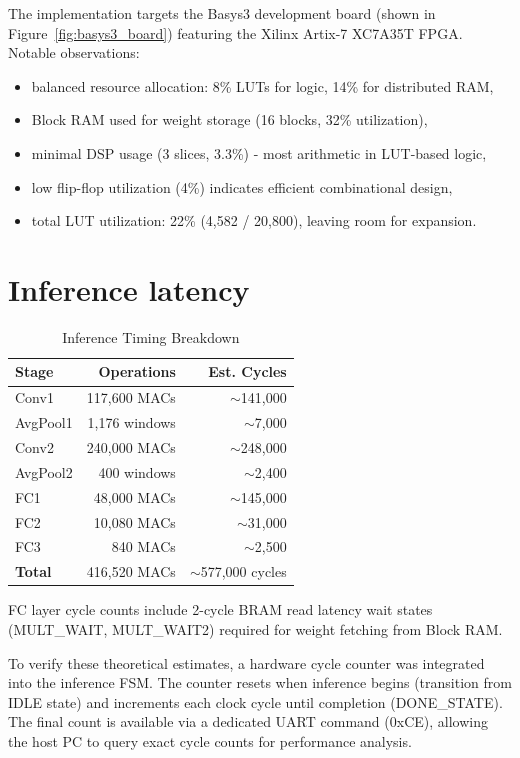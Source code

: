 \documentclass[12pt,a4paper]{report}
\begin{document}
The implementation targets the Basys3 development board (shown in Figure~\ref{fig:basys3_board}) featuring the Xilinx Artix-7 XC7A35T FPGA. Notable observations:
\begin{itemize}
    \item balanced resource allocation: 8\% LUTs for logic, 14\% for distributed RAM,
    \item Block RAM used for weight storage (16 blocks, 32\% utilization),
    \item minimal DSP usage (3 slices, 3.3\%) - most arithmetic in LUT-based logic,
    \item low flip-flop utilization (4\%) indicates efficient combinational design,
    \item total LUT utilization: 22\% (4,582 / 20,800), leaving room for expansion.
\end{itemize}

\section{Inference latency}

\begin{table}[H]
\centering
\caption{Inference Timing Breakdown}
\label{tab:timing}
\begin{tabular}{lrr}
\toprule
\textbf{Stage} & \textbf{Operations} & \textbf{Est. Cycles} \\
\midrule
Conv1 & 117,600 MACs & $\sim$141,000 \\
AvgPool1 & 1,176 windows & $\sim$7,000 \\
Conv2 & 240,000 MACs & $\sim$248,000 \\
AvgPool2 & 400 windows & $\sim$2,400 \\
FC1 & 48,000 MACs & $\sim$145,000 \\
FC2 & 10,080 MACs & $\sim$31,000 \\
FC3 & 840 MACs & $\sim$2,500 \\
\midrule
\textbf{Total} & 416,520 MACs & $\sim$577,000 cycles \\
\bottomrule
\end{tabular}

\smallskip
\small FC layer cycle counts include 2-cycle BRAM read latency wait states (MULT\_WAIT, MULT\_WAIT2) required for weight fetching from Block RAM.
\end{table}

To verify these theoretical estimates, a hardware cycle counter was integrated into the inference FSM. The counter resets when inference begins (transition from IDLE state) and increments each clock cycle until completion (DONE\_STATE). The final count is available via a dedicated UART command (0xCE), allowing the host PC to query exact cycle counts for performance analysis.
\end{document}
